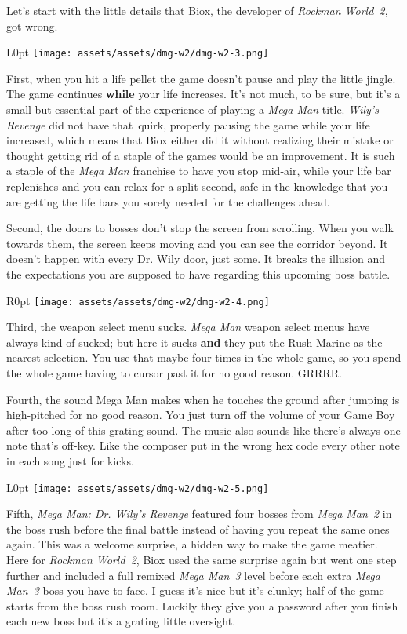 \documentclass{book}
\begin{document}
Let’s start with the little details that Biox, the developer of \emph{Rockman World 2}, got wrong.

\begin{wrapfigure}{L}{0pt} \texttt{[image: assets/assets/dmg-w2/dmg-w2-3.png]}\end{wrapfigure}
First, when you hit a life pellet the game doesn’t pause and play the little jingle. The game continues \textbf{while} your life increases. It’s not much, to be sure, but it’s a small but essential part of the experience of playing a \emph{Mega Man} title. \emph{Wily’s Revenge} did not have that quirk, properly pausing the game while your life increased, which means that Biox either did it without realizing their mistake or thought getting rid of a staple of the games would be an improvement. It is such a staple of the \emph{Mega Man} franchise to have you stop mid-air, while your life bar replenishes and you can relax for a split second, safe in the knowledge that you are getting the life bars you sorely needed for the challenges ahead.

Second, the doors to bosses don’t stop the screen from scrolling. When you walk towards them, the screen keeps moving and you can see the corridor beyond. It doesn’t happen with every Dr. Wily door, just some. It breaks the illusion and the expectations you are supposed to have regarding this upcoming boss battle.

\begin{wrapfigure}{R}{0pt} \texttt{[image: assets/assets/dmg-w2/dmg-w2-4.png]}\end{wrapfigure}
Third, the weapon select menu sucks. \emph{Mega Man} weapon select menus have always kind of sucked; but here it sucks \textbf{and} they put the Rush Marine as the nearest selection. You use that maybe four times in the whole game, so you spend the whole game having to cursor past it for no good reason. GRRRR.

Fourth, the sound Mega Man makes when he touches the ground after jumping is high-pitched for no good reason. You just turn off the volume of your Game Boy after too long of this grating sound. The music also sounds like there’s always one note that’s off-key. Like the composer put in the wrong hex code every other note in each song just for kicks.

\begin{wrapfigure}{L}{0pt} \texttt{[image: assets/assets/dmg-w2/dmg-w2-5.png]}\end{wrapfigure}
Fifth, \emph{Mega Man: Dr. Wily’s Revenge} featured four bosses from \emph{Mega Man 2} in the boss rush before the final battle instead of having you repeat the same ones again. This was a welcome surprise, a hidden way to make the game meatier. Here for \emph{Rockman World 2}, Biox used the same surprise again but went one step further and included a full remixed \emph{Mega Man 3} level before each extra \emph{Mega Man 3} boss you have to face. I guess it’s nice but it’s clunky; half of the game starts from the boss rush room. Luckily they give you a password after you finish each new boss but it’s a grating little oversight.
\end{document}
